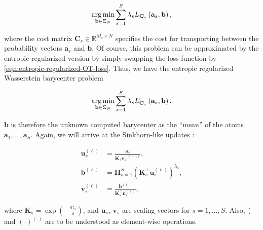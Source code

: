 \begin{equation*}
  \begin{aligned}
    \operatorname*{arg\,min}_{\mathbf{b} \in \Sigma_N} \sum_{s=1}^S \lambda_s L_{\mathbf{C}_s} \left(\mathbf{a}_s, \mathbf{b}\right),
  \end{aligned}
\end{equation*}

where the cost matrix $\mathbf{C}_s \in \mathbb{R}^{M_s \times N}$ specifies the cost for transporting
between the probability vectors $\mathbf{a}_s$ and $\mathbf{b}$.
Of course, this problem can be approximated by the entropic regularized version
by simply swapping the loss function by \cref{eqn:entropic-regularized-OT-loss}.
Thus, we have the entropic regularized Wasserstein barycenter problem

\begin{equation}
  \begin{aligned}
    \operatorname*{arg\,min}_{\mathbf{b} \in \Sigma_N} \sum_{s=1}^S \lambda_s L_{\mathbf{C}_s}^\varepsilon \left(\mathbf{a}_s, \mathbf{b}\right).
  \end{aligned}
\end{equation}

$\mathbf{b}$ is therefore the unknown computed barycenter as the ``mean'' of
the atoms $\mathbf{a}_1, \ldots, \mathbf{a}_S$.
Again, we will arrive at the Sinkhorn-like updates \citep{benamou2015,schmitz2018}:

\begin{equation}\label{eqn:barycenter-sinkhorn-like-vector-update}
  \begin{aligned}
    \mathbf{u}_s^{(\ell)}
     & = \frac{\mathbf{a}_s}{\mathbf{K}_s \mathbf{v}_s^{(\ell-1)}},                                   \\
    \mathbf{b}^{(\ell)}
     & = \boldsymbol{\Pi}_{s = 1}^S \left(\mathbf{K}_s^\top \mathbf{u}_s^{(\ell)}\right)^{\lambda_s}, \\
    \mathbf{v}_s^{(\ell)}
     & = \frac{\mathbf{b}^{(\ell)}}{\mathbf{K}_s^\top \mathbf{u}_s^{(\ell)}},
  \end{aligned}
\end{equation}

where $\mathbf{K}_s = \exp \left(-\frac{\mathbf{C}_s}{\varepsilon}\right)$,
and $\mathbf{u}_s$, $\mathbf{v}_s$ are scaling vectors for $s = 1, \ldots, S$.
Also, $\frac\cdot\cdot$ and $\left(\cdot\right)^{(\cdot)}$ are to be understood as element-wise operations.

